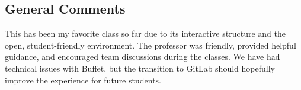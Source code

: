 \documentclass[12pt]{article}
\begin{document}
\subsection{General Comments}

This has been my favorite class so far due to its interactive structure and the open, student-friendly environment. The professor was friendly, provided helpful guidance, and encouraged team discussions during the classes. We have had technical issues with Buffet, but the transition to GitLab should hopefully improve the experience for future students.
\end{document}
